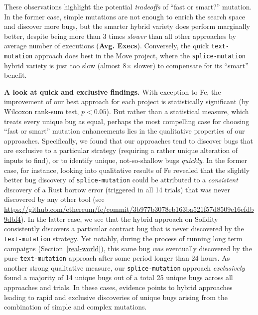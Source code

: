 \begin{sloppypar}
These observations highlight the potential \emph{tradeoffs} of ``fast or
smart?'' mutation. In the former case, simple mutations are not enough to
enrich the search space and discover more bugs, but the smarter hybrid variety
does perform marginally better, despite being more than 3 times \emph{slower}
than all other approaches by average number of executions (\textbf{Avg.
Execs}). Conversely, the quick \texttt{text-mutation} approach does best in the
Move project, where the \texttt{splice-mutation} hybrid variety is just too
slow (almost 8$\times$ slower) to compensate for its ``smart''
benefit.
\end{sloppypar}

\textbf{A look at quick and exclusive findings.} With exception to Fe, the
improvement of our best approach for each project is statistically significant
(by Wilcoxon rank-sum test, $p < 0.05$).  But rather than a statistical
measure, which treats every unique bug as equal, perhaps the most compelling
case for choosing ``fast or smart'' mutation enhancements lies in the
qualitative properties of our approaches. Specifically, we found that our
approaches tend to discover bugs that are exclusive to a particular strategy
(requiring a rather unique alteration of inputs to find), or to identify
unique, not-so-shallow bugs \emph{quickly}. In the former case, for instance,
looking into qualitative results of Fe revealed that the slightly better bug
discovery of \texttt{splice-mutation} could be attributed to a
\emph{consistent} discovery of a Rust borrow error (triggered in all 14 trials)
that was never discovered by any other tool (see
\url{https://github.com/ethereum/fe/commit/3b977b3078eb163ba521f57d8509e16efdb9dbf4}). In the latter case, we see that the
hybrid approach on Solidity consistently discovers a particular contract
bug that is never discovered by the
\texttt{text-mutation} strategy. Yet notably, during the process of running
long term campaigns (Section~\ref{real-world}), this same bug \emph{was}
eventually discovered by the pure \texttt{text-mutation} approach after some
period longer than 24 hours. As another strong qualitative measure, our
\texttt{splice-mutation} approach \emph{exclusively} found a majority of 14
unique bugs out of a total 25 unique bugs across all approaches and trials.  In
these cases, evidence points to hybrid approaches leading to rapid and
exclusive discoveries of unique bugs arising from the combination of simple and
complex mutations.

